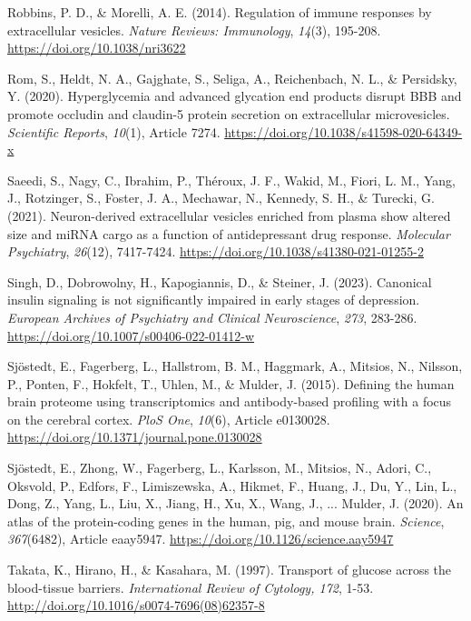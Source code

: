 \documentclass[authordate, empirical, issue]{jote-new-article}
\begin{document}
	Robbins, P. D., \& Morelli, A. E. (2014). Regulation of immune responses by extracellular vesicles. \emph{Nature Reviews: Immunology},\emph{ 14}(3), 195-208. \url{https://doi.org/10.1038/nri3622}



	Rom, S., Heldt, N. A., Gajghate, S., Seliga, A., Reichenbach, N. L., \& Persidsky, Y. (2020). Hyperglycemia and advanced glycation end products disrupt BBB and promote occludin and claudin-5 protein secretion on extracellular microvesicles. \emph{Scientific Reports},\emph{ 10}(1), Article 7274. \url{https://doi.org/10.1038/s41598-020-64349-x}



	Saeedi, S., Nagy, C., Ibrahim, P., Théroux, J. F., Wakid, M., Fiori, L. M., Yang, J., Rotzinger, S., Foster, J. A., Mechawar, N., Kennedy, S. H., \& Turecki, G. (2021). Neuron-derived extracellular vesicles enriched from plasma show altered size and miRNA cargo as a function of antidepressant drug response. \emph{Molecular Psychiatry},\emph{ 26}(12), 7417-7424. \url{https://doi.org/10.1038/s41380-021-01255-2}



	Singh, D., Dobrowolny, H., Kapogiannis, D., \& Steiner, J. (2023). Canonical insulin signaling is not significantly impaired in early stages of depression. \emph{European Archives of Psychiatry and Clinical Neuroscience},\emph{ 273}, 283-286. \url{https://doi.org/10.1007/s00406-022-01412-w}



	Sjöstedt, E., Fagerberg, L., Hallstrom, B. M., Haggmark, A., Mitsios, N., Nilsson, P., Ponten, F., Hokfelt, T., Uhlen, M., \& Mulder, J. (2015). Defining the human brain proteome using transcriptomics and antibody-based profiling with a focus on the cerebral cortex. \emph{PloS One},\emph{ 10}(6), Article e0130028. \url{https://doi.org/10.1371/journal.pone.0130028}



	Sjöstedt, E., Zhong, W., Fagerberg, L., Karlsson, M., Mitsios, N., Adori, C., Oksvold, P., Edfors, F., Limiszewska, A., Hikmet, F., Huang, J., Du, Y., Lin, L., Dong, Z., Yang, L., Liu, X., Jiang, H., Xu, X., Wang, J., ... Mulder, J. (2020). An atlas of the protein-coding genes in the human, pig, and mouse brain. \emph{Science},\emph{ 367}(6482), Article eaay5947. \url{https://doi.org/10.1126/science.aay5947}



	Takata, K., Hirano, H., \& Kasahara, M. (1997). Transport of glucose across the blood-tissue barriers. \emph{International Review of Cytology, 172}, 1-53. \url{http://doi.org/10.1016/s0074-7696(08)62357-8}
\end{document}

